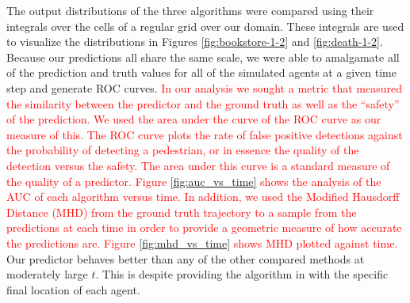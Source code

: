 \documentclass[letterpaper,10pt,conference]{ieeeconf}
\newcommand{\rtext}[1]{\textcolor{red}{#1}}
\begin{document}
The output distributions of the three algorithms were compared using their integrals over the cells of a regular grid over our domain. 
These integrals are used to visualize the distributions in Figures \ref{fig:bookstore-1-2} and \ref{fig:death-1-2}.
Because our predictions all share the same scale, we were able to amalgamate all of the prediction and truth values for all of the simulated agents at a given time step and generate ROC curves. \rtext{In our analysis we sought a metric that measured the similarity between the predictor and the ground truth as well as the ``safety'' of the prediction. We used the area under the curve of the ROC curve as our measure of this. The ROC curve plots the rate of false positive detections against the probability of detecting a pedestrian, or in essence the quality of the detection versus the safety. The area under this curve is a standard measure of the quality of a predictor. Figure \ref{fig:auc_vs_time} shows the analysis of the AUC of each algorithm versus time. In addition, we used the Modified Hausdorff Distance (MHD) from the ground truth trajectory to a sample from the predictions at each time in order to provide a geometric measure of how accurate the predictions are. Figure \ref{fig:mhd_vs_time} shows MHD plotted against time.}
Our predictor behaves better than any of the other compared methods at moderately large $t$.
This is despite providing the algorithm in \cite{Kitani2012} with the specific final location of each agent.
\end{document}
